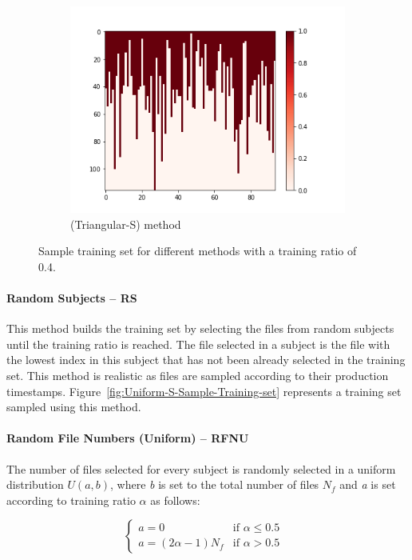 \documentclass[10pt, conference, compsocconf]{IEEEtran}
\begin{document}
\begin{figure}[h!]
\begin{subfigure}[b]{0.4\linewidth}
  		\includegraphics[width=\columnwidth]{figures/5vs7_random-triangular-smallest_04_training}
  		\caption{(Triangular-S) method}
  		\label{fig:triangular-S-Sample-Training-set}
	\end{subfigure}
	\caption{Sample training set for different methods with a training ratio of 0.4.}		
\end{figure}

\paragraph{Random Subjects -- RS} This method builds the 
training set by selecting the files from random subjects 
until the training ratio is reached. The file selected in a 
subject is the file with the lowest index in this subject that has not 
been already selected in the training set. This method is realistic as 
files are sampled according to their production timestamps. 
Figure~\ref{fig:Uniform-S-Sample-Training-set} represents a training 
set sampled using this method.

\paragraph{Random File Numbers (Uniform) -- RFNU}

The number of files selected for every subject is randomly selected in
a uniform distribution $U(\textit{a},\textit{b})$, where \textit{b} is set to the total
number of files $N_{f}$ and \textit{a} is set according to training ratio $\alpha$ as follows:

\[
  \begin{cases}
          \textit{a} = 0      & \text{if $\alpha \leq 0.5$ }\\
          
          \textit{a} = (2\alpha - 1) N_{f} & \text{if $\alpha > 0.5$}
  \end{cases}
\]
\end{document}
